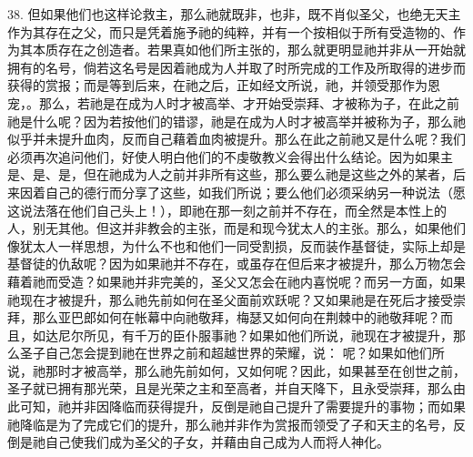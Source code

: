 38. 但如果他们也这样论救主，那么祂就既非，也非，既不肖似圣父，也绝无天主作为其存在之父，而只是凭着施予祂的纯粹，并有一个按相似于所有受造物的、作为其本质存在之创造者。若果真如他们所主张的，那么就更明显祂并非从一开始就拥有的名号，倘若这名号是因着祂成为人并取了时所完成的工作及所取得的进步而获得的赏报；而是等到后来，在祂之后，正如经文所说，祂，并领受那作为恩宠，。那么，若祂是在成为人时才被高举、才开始受崇拜、才被称为子，在此之前祂是什么呢？因为若按他们的错谬，祂是在成为人时才被高举并被称为子，那么祂似乎并未提升血肉，反而自己藉着血肉被提升。那么在此之前祂又是什么呢？我们必须再次追问他们，好使人明白他们的不虔敬教义会得出什么结论。因为如果主是、是、是，但在祂成为人之前并非所有这些，那么要么祂是这些之外的某者，后来因着自己的德行而分享了这些，如我们所说；要么他们必须采纳另一种说法（愿这说法落在他们自己头上！），即祂在那一刻之前并不存在，而全然是本性上的人，别无其他。但这并非教会的主张，而是和现今犹太人的主张。那么，如果他们像犹太人一样思想，为什么不也和他们一同受割损，反而装作基督徒，实际上却是基督徒的仇敌呢？因为如果祂并不存在，或虽存在但后来才被提升，那么万物怎会藉着祂而受造？如果祂并非完美的，圣父又怎会在祂内喜悦呢？而另一方面，如果祂现在才被提升，那么祂先前如何在圣父面前欢跃呢？又如果祂是在死后才接受崇拜，那么亚巴郎如何在帐幕中向祂敬拜，梅瑟又如何向在荆棘中的祂敬拜呢？而且，如达尼尔所见，有千万的臣仆服事祂？如果如他们所说，祂现在才被提升，那么圣子自己怎会提到祂在世界之前和超越世界的荣耀，说： 呢？如果如他们所说，祂那时才被高举，那么祂先前如何，又如何呢？因此，如果甚至在创世之前，圣子就已拥有那光荣，且是光荣之主和至高者，并自天降下，且永受崇拜，那么由此可知，祂并非因降临而获得提升，反倒是祂自己提升了需要提升的事物；而如果祂降临是为了完成它们的提升，那么祂并非作为赏报而领受了子和天主的名号，反倒是祂自己使我们成为圣父的子女，并藉由自己成为人而将人神化。\par


